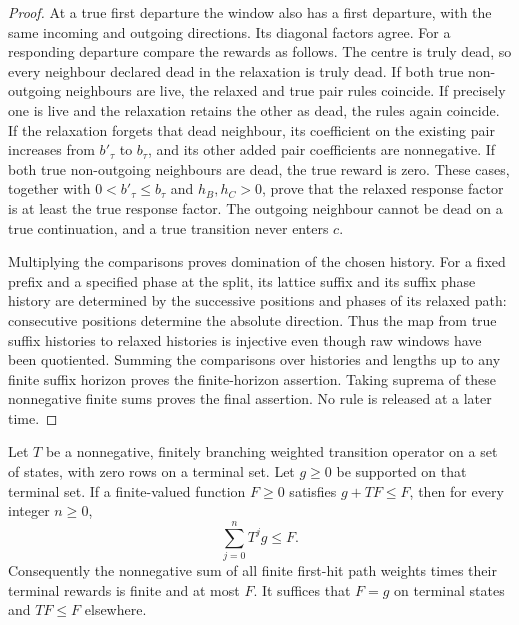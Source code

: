 \begin{proof}
At a true first departure the window also has a first departure,
with the same incoming and outgoing directions. Its diagonal factors
agree. For a responding departure compare the rewards as follows.
The centre is truly dead, so every neighbour declared dead in the
relaxation is truly dead. If both true non-outgoing neighbours are
live, the relaxed and true pair rules coincide. If precisely one is
live and the relaxation retains the other as dead, the rules again
coincide. If the relaxation forgets that dead neighbour, its
coefficient on the existing pair increases from \(b'_\tau\) to
\(b_\tau\), and its other added pair coefficients are nonnegative.
If both true non-outgoing neighbours are dead, the true reward is
zero. These cases, together with \(0<b'_\tau\le b_\tau\) and
\(h_B,h_C>0\), prove that the relaxed response factor is at least
the true response factor. The outgoing neighbour cannot be dead
on a true continuation, and a true transition never enters \(c\).

Multiplying the comparisons proves domination of the chosen
history. For a fixed prefix and a specified phase at the split,
its lattice suffix and its suffix phase history are determined by
the successive positions and phases of its relaxed path:
consecutive positions determine the absolute direction. Thus the
map from true suffix histories to relaxed histories is injective even
though raw windows have been quotiented. Summing the comparisons
over histories and lengths up to any finite suffix horizon proves
the finite-horizon assertion. Taking suprema of these nonnegative
finite sums proves the final assertion. No rule is released at a
later time.
\end{proof}

\begin{lemma}\label{l:Bellman-soundness}
Let \(T\) be a nonnegative, finitely branching weighted transition
operator on a set of states, with zero rows on a terminal set.
Let \(g\ge0\) be supported on that terminal set.
If a finite-valued function \(F\ge0\) satisfies
\(g+TF\le F\), then for every integer \(n\ge0\),
\[
 \sum_{j=0}^{n}T^jg\le F .
\]
Consequently the nonnegative sum of all finite first-hit path
weights times their terminal rewards is finite and at most \(F\).
It suffices that \(F=g\) on terminal states and \(TF\le F\)
elsewhere.
\end{lemma}

